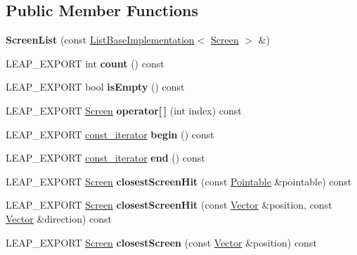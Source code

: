 \subsection*{Public Member Functions}
\begin{DoxyCompactItemize}
\item 
\mbox{\label{class_leap_1_1_screen_list_a7ce73ebf3b8f5d85f456417a3fd5227c}} 
{\bfseries Screen\+List} (const \hyperlink{class_leap_1_1_list_base_implementation}{List\+Base\+Implementation}$<$ \hyperlink{class_leap_1_1_screen}{Screen} $>$ \&)
\item 
\mbox{\label{class_leap_1_1_screen_list_ae8579e90cd6a67db0c6476846eac37a9}} 
L\+E\+A\+P\+\_\+\+E\+X\+P\+O\+RT int {\bfseries count} () const
\item 
\mbox{\label{class_leap_1_1_screen_list_aa4e17398492d45054d47a5fac1260645}} 
L\+E\+A\+P\+\_\+\+E\+X\+P\+O\+RT bool {\bfseries is\+Empty} () const
\item 
\mbox{\label{class_leap_1_1_screen_list_a13f5f0a4020eab5283aaf3a74be0d3e8}} 
L\+E\+A\+P\+\_\+\+E\+X\+P\+O\+RT \hyperlink{class_leap_1_1_screen}{Screen} {\bfseries operator\mbox{[}$\,$\mbox{]}} (int index) const
\item 
\mbox{\label{class_leap_1_1_screen_list_aa9c9f5dd781e36bfcc51f50fe2bbf2be}} 
L\+E\+A\+P\+\_\+\+E\+X\+P\+O\+RT \hyperlink{class_leap_1_1_const_list_iterator}{const\+\_\+iterator} {\bfseries begin} () const
\item 
\mbox{\label{class_leap_1_1_screen_list_a70fdbaeccd6c8f94c3fab7c7d25b2824}} 
L\+E\+A\+P\+\_\+\+E\+X\+P\+O\+RT \hyperlink{class_leap_1_1_const_list_iterator}{const\+\_\+iterator} {\bfseries end} () const
\item 
\mbox{\label{class_leap_1_1_screen_list_a12b67887181a5428c99b9f9d4255e95b}} 
L\+E\+A\+P\+\_\+\+E\+X\+P\+O\+RT \hyperlink{class_leap_1_1_screen}{Screen} {\bfseries closest\+Screen\+Hit} (const \hyperlink{class_leap_1_1_pointable}{Pointable} \&pointable) const
\item 
\mbox{\label{class_leap_1_1_screen_list_af8666d2da04e20940725288351ce5db6}} 
L\+E\+A\+P\+\_\+\+E\+X\+P\+O\+RT \hyperlink{class_leap_1_1_screen}{Screen} {\bfseries closest\+Screen\+Hit} (const \hyperlink{struct_leap_1_1_vector}{Vector} \&position, const \hyperlink{struct_leap_1_1_vector}{Vector} \&direction) const
\item 
\mbox{\label{class_leap_1_1_screen_list_aa8b1f417fdc4664823e0910462f4cce3}} 
L\+E\+A\+P\+\_\+\+E\+X\+P\+O\+RT \hyperlink{class_leap_1_1_screen}{Screen} {\bfseries closest\+Screen} (const \hyperlink{struct_leap_1_1_vector}{Vector} \&position) const
\end{DoxyCompactItemize}
